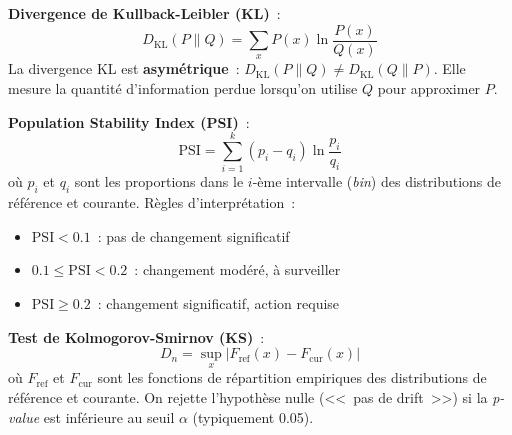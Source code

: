 \begin{formules}[title=\textbf{M\'etriques de d\'etection de drift}]
\textbf{Divergence de Kullback-Leibler (KL)}~:
\[
D_{\mathrm{KL}}(P \| Q) = \sum_{x} P(x) \ln \frac{P(x)}{Q(x)}
\]
La divergence KL est \textbf{asym\'etrique}~: $D_{\mathrm{KL}}(P \| Q) \neq D_{\mathrm{KL}}(Q \| P)$. Elle mesure la quantit\'e d'information perdue lorsqu'on utilise $Q$ pour approximer $P$.

\medskip
\textbf{Population Stability Index (PSI)}~:
\[
\mathrm{PSI} = \sum_{i=1}^{k} (p_i - q_i) \ln \frac{p_i}{q_i}
\]
o\`u $p_i$ et $q_i$ sont les proportions dans le $i$-\`eme intervalle (\emph{bin}) des distributions de r\'ef\'erence et courante. R\`egles d'interpr\'etation~:
\begin{itemize}
    \item $\mathrm{PSI} < 0.1$~: pas de changement significatif
    \item $0.1 \leq \mathrm{PSI} < 0.2$~: changement mod\'er\'e, \`a surveiller
    \item $\mathrm{PSI} \geq 0.2$~: changement significatif, action requise
\end{itemize}

\medskip
\textbf{Test de Kolmogorov-Smirnov (KS)}~:
\[
D_n = \sup_x |F_{\text{ref}}(x) - F_{\text{cur}}(x)|
\]
o\`u $F_{\text{ref}}$ et $F_{\text{cur}}$ sont les fonctions de r\'epartition empiriques des distributions de r\'ef\'erence et courante. On rejette l'hypoth\`ese nulle (<<~pas de drift~>>) si la \emph{p-value} est inf\'erieure au seuil $\alpha$ (typiquement 0.05).
\end{formules}


